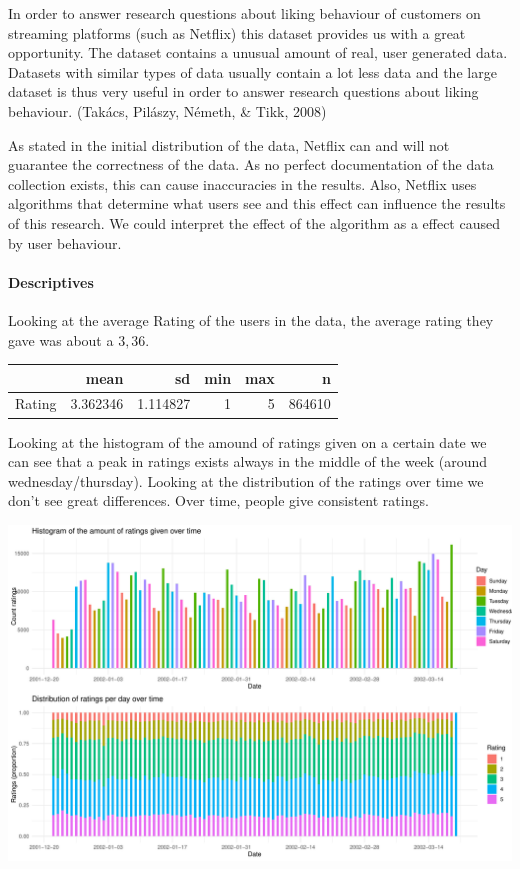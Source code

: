 \documentclass[
  english,
  man,floatsintext]{apa6}
\let\oldparagraph\paragraph
\renewcommand{\paragraph}[1]{\oldparagraph{#1}\mbox{}}
\begin{document}
In order to answer research questions about liking behaviour of customers on streaming platforms (such as Netflix) this dataset provides us with a great opportunity. The dataset contains a unusual amount of real, user generated data. Datasets with similar types of data usually contain a lot less data and the large dataset is thus very useful in order to answer research questions about liking behaviour. (Takács, Pilászy, Németh, \& Tikk, 2008)

As stated in the initial distribution of the data, Netflix can and will not guarantee the correctness of the data. As no perfect documentation of the data collection exists, this can cause inaccuracies in the results. Also, Netflix uses algorithms that determine what users see and this effect can influence the results of this research. We could interpret the effect of the algorithm as a effect caused by user behaviour.

\hypertarget{descriptives}{%
\paragraph{Descriptives}\label{descriptives}}

Looking at the average Rating of the users in the data, the average rating they gave was about a \(3,36\).

\begin{table}
\centering
\begin{tabular}{l|r|r|r|r|r}
\hline
  & mean & sd & min & max & n\\
\hline
Rating & 3.362346 & 1.114827 & 1 & 5 & 864610\\
\hline
\end{tabular}
\end{table}

Looking at the histogram of the amound of ratings given on a certain date we can see that a peak in ratings exists always in the middle of the week (around wednesday/thursday). Looking at the distribution of the ratings over time we don't see great differences. Over time, people give consistent ratings.

\includegraphics{SNA4DSprojectReport_files/figure-latex/unnamed-chunk-5-1.pdf}
\end{document}
